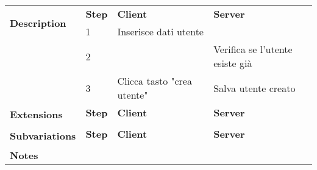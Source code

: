\begin{table}[H]
\begin{tabularx}{\linewidth}{|l|X|X|X|}
        \hline \multirow{2}{*}{\textbf{Description}} & \textbf{Step}                                                                     &
        \textbf{Client}                              & \textbf{Server}                                                                                                                                  \\
        \cline{2-4}                                  & 1                                                                                 & Inserisce dati utente      &                                 \\
        \cline{2-4}                                  & 2                                                                                 &                            & Verifica se l'utente esiste già \\
        \cline{2-4}                                  & 3                                                                                 & Clicca tasto "crea utente" & Salva utente creato             \\
        \hline \multirow{2}{*}{\textbf{Extensions}}  & \textbf{Step}                                                                     &
        \textbf{Client}                              & \textbf{Server}                                                                                                                                  \\
        \cline{2-4}                                  &                                                                                   &                            &                                 \\
        \hline
        \multirow{2}{*}{\textbf{Subvariations}}      & \textbf{Step}                                                                     & \textbf{Client}            & \textbf{Server}                 \\

        \cline{2-4}                                  &                                                                                   &                            &                                 \\
        \hline \textbf{Notes}                        & \multicolumn{3}{l|}{}                                                                                                                            \\
        \hline
    \end{tabularx}

\end{table}


